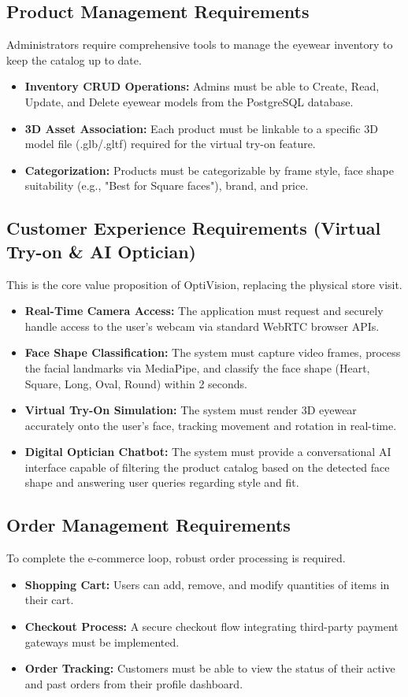 \subsection{Product Management Requirements}
Administrators require comprehensive tools to manage the eyewear inventory to keep the catalog up to date.
\begin{itemize}
    \item \textbf{Inventory CRUD Operations:} Admins must be able to Create, Read, Update, and Delete eyewear models from the PostgreSQL database.
    \item \textbf{3D Asset Association:} Each product must be linkable to a specific 3D model file (.glb/.gltf) required for the virtual try-on feature.
    \item \textbf{Categorization:} Products must be categorizable by frame style, face shape suitability (e.g., "Best for Square faces"), brand, and price.
\end{itemize}

\subsection{Customer Experience Requirements (Virtual Try-on \& AI Optician)}
This is the core value proposition of OptiVision, replacing the physical store visit.
\begin{itemize}
    \item \textbf{Real-Time Camera Access:} The application must request and securely handle access to the user's webcam via standard WebRTC browser APIs.
    \item \textbf{Face Shape Classification:} The system must capture video frames, process the facial landmarks via MediaPipe, and classify the face shape (Heart, Square, Long, Oval, Round) within 2 seconds.
    \item \textbf{Virtual Try-On Simulation:} The system must render 3D eyewear accurately onto the user's face, tracking movement and rotation in real-time.
    \item \textbf{Digital Optician Chatbot:} The system must provide a conversational AI interface capable of filtering the product catalog based on the detected face shape and answering user queries regarding style and fit.
\end{itemize}

\subsection{Order Management Requirements}
To complete the e-commerce loop, robust order processing is required.
\begin{itemize}
    \item \textbf{Shopping Cart:} Users can add, remove, and modify quantities of items in their cart.
    \item \textbf{Checkout Process:} A secure checkout flow integrating third-party payment gateways must be implemented.
    \item \textbf{Order Tracking:} Customers must be able to view the status of their active and past orders from their profile dashboard.
\end{itemize}

